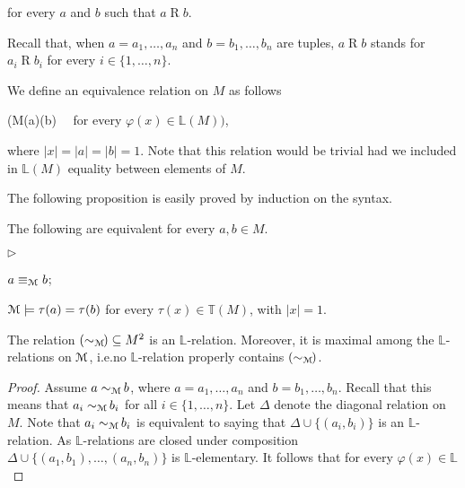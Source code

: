 \documentclass[10pt,oneside]{amsproc}
\newcommand{\mylabel}[1]{{#1}\hfill}
\renewenvironment{itemize}
  {\begin{list}{$\triangleright$}{%
  \setlength{\parskip}{0mm}
  \setlength{\topsep}{.4\baselineskip}
  \setlength{\rightmargin}{0mm}
  \setlength{\listparindent}{0mm}
  \setlength{\itemindent}{0mm}
  \setlength{\labelwidth}{3ex}
  \setlength{\itemsep}{.2\baselineskip}
  \setlength{\parsep}{.2\baselineskip}
  \setlength{\partopsep}{0mm}
  \setlength{\labelsep}{1ex}
  \setlength{\leftmargin}{\labelwidth+\labelsep}
  \let\makelabel\mylabel}}{%
\end{list}}
\renewcommand*{\emph}[1]{%
   \smash{\tikz[baseline]\node[rectangle, fill=teal!25, rounded corners, inner xsep=0.5ex, inner ysep=0.2ex, anchor=base, minimum height = 2.7ex]{\strut #1};}}
\begin{document}
{ \hfill for every $a$ and $b$ such that $a\mathbin{R}b$.

Recall that, when $a=a_1,\dots,a_n$ and $b=b_1,\dots,b_n$ are tuples, $a\mathbin{R}b$ stands for $a_i\mathbin{R}b_i$ for every $i\in\{1,\dots,n\}$.

We define an equivalence relation \emph{$(\sim_{\EuScript M})$\/} on $ M$ as follows

{\Leftrightarrow}
{\Big({\EuScript M}\models\varphi(a)\leftrightarrow\varphi(b)}
\ \ for every $\varphi(x)\in\mathds{L}( M)\Big)$,

where $|x|=|a|=|b|=1$.
Note that this relation would be trivial had we included  in $\mathds{L}(M)$ equality between elements of $M$.

The following proposition is easily proved by induction on the syntax. 

\begin{proposition}
  The following are equivalent for every $a,b\in M$.
  \begin{itemize}
    \item[1.] $a\equiv_{\EuScript M}b$;
    \item[2.] ${\EuScript M}\models \tau(a)=\tau(b)$ for every $\tau(x)\in\mathds{T}(M)$, with $|x|=1$.
  \end{itemize}
\end{proposition}

\begin{lemma}
  The relation $(\sim_{\EuScript M\!})\subseteq  M^2$ is an $\mathds{L}$-relation.
  Moreover, it is maximal among the $\mathds{L}$-relations on ${\EuScript M}$, i.e.\@ no $\mathds{L}$-relation properly contains $(\sim_{\EuScript M\!})$.
\end{lemma}

\begin{proof}
  Assume $a\sim_{\EuScript M\!}b$, where $a=a_1,\dots,a_n$ and $b=b_1,\dots,b_n$.
  Recall that this means that $a_i\sim_{\EuScript M\!}b_i$ for all $i\in\{1,\dots,n\}$.
  Let $\Delta$ denote the diagonal relation on $ M$.
  Note that $a_i\sim_{\EuScript M\!}b_i$ is equivalent to saying that $\Delta\cup\{(a_i,b_i)\}$ is an $\mathds{L}$-relation.
  As $\mathds{L}$-relations are closed under composition $\Delta\cup\big\{(a_1,b_1),\dots,(a_n,b_n)\big\}$ is $\mathds{L}$-elementary.
  It follows that for every $\varphi(x)\in\mathds{L}$

  

\end{proof}}
\end{document}
